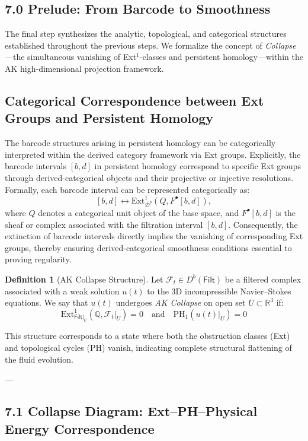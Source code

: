 \documentclass[11pt]{article}
\theoremstyle{definition}
\newtheorem{definition}[theorem]{Definition}
\begin{document}
\subsection*{7.0 Prelude: From Barcode to Smoothness}

The final step synthesizes the analytic, topological, and categorical structures established throughout the previous steps.  
We formalize the concept of \emph{Collapse}—the simultaneous vanishing of Ext$^1$-classes and persistent homology—within the AK high-dimensional projection framework.

\subsection{Categorical Correspondence between Ext Groups and Persistent Homology}

The barcode structures arising in persistent homology can be categorically interpreted within the derived category framework via Ext groups. Explicitly, the barcode intervals $[b,d]$ in persistent homology correspond to specific Ext groups through derived-categorical objects and their projective or injective resolutions. Formally, each barcode interval can be represented categorically as:
\[
[b,d] \longleftrightarrow \mathrm{Ext}^1_{\mathcal{D}^b}(Q,F^\bullet[b,d]),
\]
where $Q$ denotes a categorical unit object of the base space, and $F^\bullet[b,d]$ is the sheaf or complex associated with the filtration interval $[b,d]$. Consequently, the extinction of barcode intervals directly implies the vanishing of corresponding Ext groups, thereby ensuring derived-categorical smoothness conditions essential to proving regularity.


\begin{definition}[AK Collapse Structure] \label{def:ak-collapse}
Let $\mathcal{F}_t \in D^b(\mathsf{Filt})$ be a filtered complex associated with a weak solution $u(t)$ to the 3D incompressible Navier--Stokes equations.  
We say that $u(t)$ undergoes \emph{AK Collapse} on open set $U \subset \mathbb{R}^3$ if:
\[
\mathrm{Ext}^1_{\mathsf{Filt}|_U}(\mathbb{Q}, \mathcal{F}_t|_U) = 0 \quad \text{and} \quad \mathrm{PH}_1(u(t)|_U) = 0
\]
\end{definition}

This structure corresponds to a state where both the obstruction classes (Ext) and topological cycles (PH) vanish, indicating complete structural flattening of the fluid evolution.

---

\subsection*{7.1 Collapse Diagram: Ext–PH–Physical Energy Correspondence}
\end{document}
